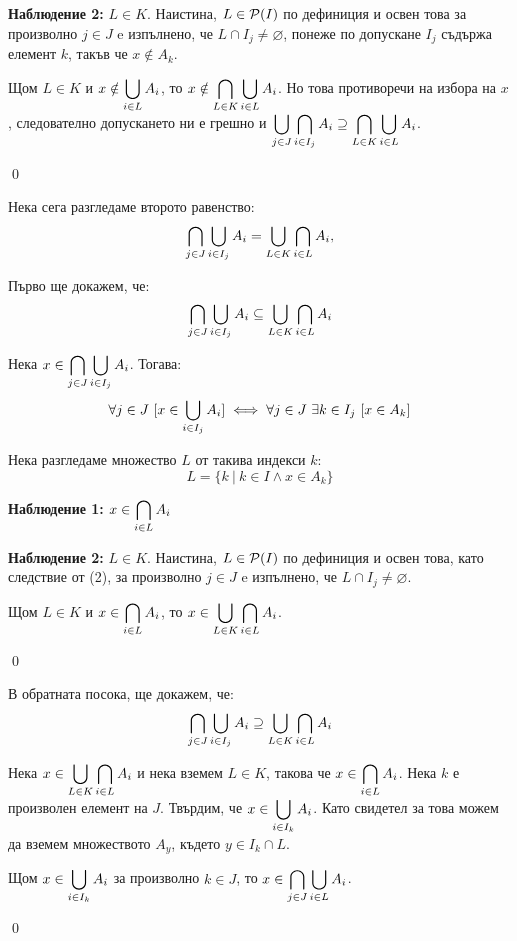 \begin{problem}
\begin{tcolorbox}[mybox={Доказателство:}]
\textbf{Наблюдение 2:} $L \in K$.
Наистина, $L \in \mathcal{P}(I)$ по дефиниция и освен това за произволно $j \in J$ e изпълнено, че $L \cap I_j \neq \varnothing$,
понеже по допускане $I_j$ съдържа елемент $k$, такъв че $x \notin A_k$.

\bigbreak
Щом $L \in K$ и $\displaystyle x \notin \bigcup_{i \in L} A_i$, то
$\displaystyle x \notin \bigcap_{L \in K} \bigcup_{i \in L} A_i$.
Но това противоречи на избора на $x$, следователно допускането ни е грешно и
$\displaystyle \bigcup_{j \in J} \bigcap_{i \in I_j} A_i \supseteq \bigcap_{L \in K} \bigcup_{i \in L} A_i$.

\qed
\end{tcolorbox}

\bigbreak
Нека сега разгледаме второто равенство:
\[
\bigcap_{j \in J} \bigcup_{i \in I_j} A_i = \bigcup_{L \in K} \bigcap_{i \in L} A_i,
\]

Първо ще докажем, че:
\[
\bigcap_{j \in J} \bigcup_{i \in I_j} A_i \subseteq \bigcup_{L \in K} \bigcap_{i \in L} A_i
\]

\begin{tcolorbox}[mybox={Доказателство:}]
Нека
$\displaystyle x \in \bigcap_{j \in J} \bigcup_{i \in I_j} A_i$.
Тогава:
\begin{equation}
\forall j \in J \ [x \in \bigcup_{i \in I_j} A_i] \iff
\forall j \in J \ \exists k \in I_j\ [x \in A_k]
\end{equation}

Нека разгледаме множество $L$ от такива индекси $k$:
\[
L = \{k \ |\ k \in I \land x \in A_k\}
\]

\textbf{Наблюдение 1:} $\displaystyle x \in \bigcap_{i \in L} A_i$

\textbf{Наблюдение 2:} $L \in K$.
Наистина, $L \in \mathcal{P}(I)$ по дефиниция и освен това, като следствие от (2),
за произволно $j \in J$ e изпълнено, че $L \cap I_j \neq \varnothing$.

\bigbreak
Щом $L \in K$ и $\displaystyle x \in \bigcap_{i \in L} A_i$, то
$\displaystyle x \in \bigcup_{L \in K} \bigcap_{i \in L} A_i$.

\qed
\end{tcolorbox}

\bigbreak
В обратната посока, ще докажем, че:
\[
\bigcap_{j \in J} \bigcup_{i \in I_j} A_i \supseteq \bigcup_{L \in K} \bigcap_{i \in L} A_i
\]

\begin{tcolorbox}[mybox={Доказателство:}]
Нека $\displaystyle x \in \bigcup_{L \in K} \bigcap_{i \in L} A_i$ и нека вземем $L \in K$,
такова че $\displaystyle x \in \bigcap_{i \in L} A_i$.
Нека $k$ е произволен елемент на $J$.
Твърдим, че $\displaystyle x \in \bigcup_{i \in I_k} A_i$.
Като свидетел за това можем да вземем множеството $A_y$, където $y \in I_k \cap L$.

Щом $\displaystyle x \in \bigcup_{i \in I_k} A_i$ за произволно $k \in J$,
то $\displaystyle x \in \bigcap_{j \in J} \bigcup_{i \in L} A_i$.

\qed
\end{tcolorbox}

\end{problem}
